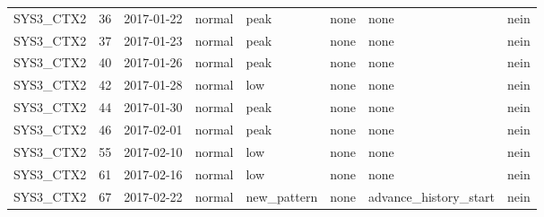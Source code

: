 \begin{tabular}{lrllllll}
SYS3\_CTX2 & 36 & 2017-01-22 & normal & peak & none & none & nein \\
SYS3\_CTX2 & 37 & 2017-01-23 & normal & peak & none & none & nein \\
SYS3\_CTX2 & 40 & 2017-01-26 & normal & peak & none & none & nein \\
SYS3\_CTX2 & 42 & 2017-01-28 & normal & low & none & none & nein \\
SYS3\_CTX2 & 44 & 2017-01-30 & normal & peak & none & none & nein \\
SYS3\_CTX2 & 46 & 2017-02-01 & normal & peak & none & none & nein \\
SYS3\_CTX2 & 55 & 2017-02-10 & normal & low & none & none & nein \\
SYS3\_CTX2 & 61 & 2017-02-16 & normal & low & none & none & nein \\
SYS3\_CTX2 & 67 & 2017-02-22 & normal & new\_pattern & none & advance\_history\_start & nein \\
\bottomrule
\end{tabular}
